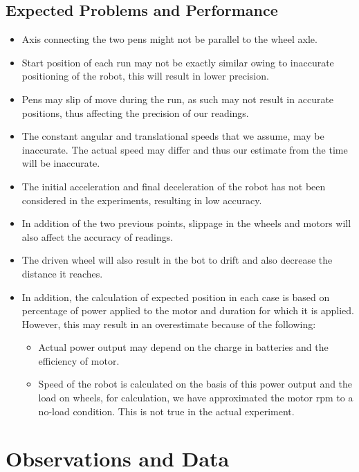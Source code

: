 \documentclass[10pt,a4paper]{article}
\begin{document}
			\subsection{Expected Problems and Performance}
				\begin{itemize}
					\item Axis connecting the two pens might not be parallel to the wheel axle.
					\item Start position of each run may not be exactly similar owing to inaccurate positioning of the robot, this will result in lower precision.
					\item Pens may slip of move during the run, as such may not result in accurate positions, thus affecting the precision of our readings.
					\item The constant angular and translational speeds that we assume, may be inaccurate. The actual speed may differ and thus our estimate from the time will be inaccurate.
					\item The initial acceleration and final deceleration of the robot has not been considered in the experiments, resulting in low accuracy.
					\item In addition of the two previous points, slippage in the wheels and motors will also affect the accuracy of readings.
					\item The driven wheel will also result in the bot to drift and also decrease the distance it reaches.
					\item In addition, the calculation of expected position in each case is based on percentage of power applied to the motor and duration for which it is applied. However, this may result in an overestimate because of the following:
						\begin{itemize}
							\item Actual power output may depend on the charge in batteries and the efficiency of motor.
							\item Speed of the robot is calculated on the basis of this power output and the load on wheels, for calculation, we have approximated the motor rpm to a no-load condition. This is not true in the actual experiment.
						\end{itemize} 
				\end{itemize}
			\section{Observations and Data}
\end{document}
